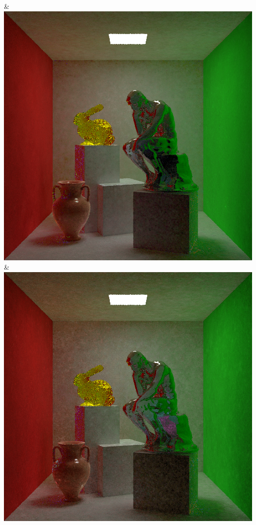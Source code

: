 & \includegraphics[width=\linewidth]{figures/py/tests/quality_comparison/nrc+sppc16@1_1spp_thinker.png}
& \includegraphics[width=\linewidth]{figures/py/tests/quality_comparison/nrc+sppc16@4_1spp_thinker.png}
